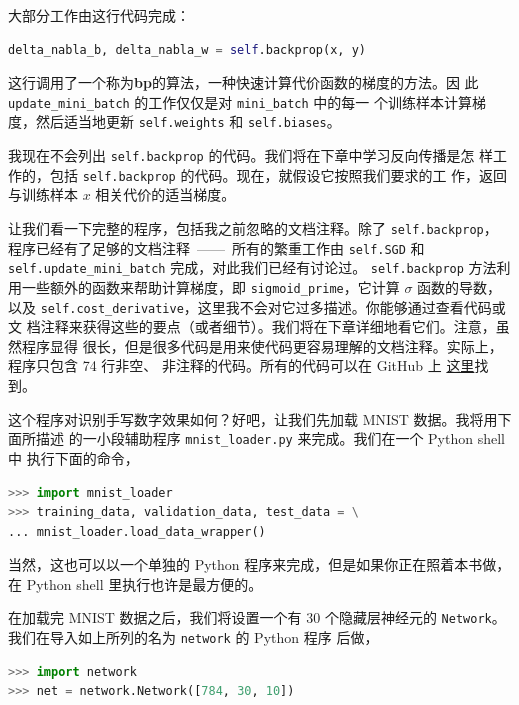 大部分工作由这行代码完成：
\begin{lstlisting}[language=Python]
     delta_nabla_b, delta_nabla_w = self.backprop(x, y)
\end{lstlisting}

这行调用了一个称为\textbf{\gls{bp}}的算法，一种快速计算代价函数的梯度的方法。因
此 \lstinline!update_mini_batch! 的工作仅仅是对 \lstinline!mini_batch! 中的每一
个训练样本计算梯度，然后适当地更新 \lstinline!self.weights! 和
\lstinline!self.biases!。

我现在不会列出 \lstinline!self.backprop! 的代码。我们将在下章中学习反向传播是怎
样工作的，包括 \lstinline!self.backprop! 的代码。现在，就假设它按照我们要求的工
作，返回与训练样本 $x$ 相关代价的适当梯度。

让我们看一下完整的程序，包括我之前忽略的文档注释。除了 \lstinline!self.backprop!，
程序已经有了足够的文档注释~——~所有的繁重工作由 \lstinline!self.SGD! 和
\lstinline!self.update_mini_batch! 完成，对此我们已经有讨论过。
\lstinline!self.backprop! 方法利用一些额外的函数来帮助计算梯度，即
\lstinline!sigmoid_prime!，它计算 $\sigma$ 函数的导数，以及
\lstinline!self.cost_derivative!，这里我不会对它过多描述。你能够通过查看代码或文
档注释来获得这些的要点（或者细节）。我们将在下章详细地看它们。注意，虽然程序显得
很长，但是很多代码是用来使代码更容易理解的文档注释。实际上，程序只包含 74 行非空、
非注释的代码。所有的代码可以在 GitHub 上%
\href{https://github.com/mnielsen/neural-networks-and-deep-learning/blob/master/src/network.py}{
  这里}找到。



这个程序对识别手写数字效果如何？好吧，让我们先加载 MNIST 数据。我将用下面所描述
的一小段辅助程序 \lstinline!mnist_loader.py! 来完成。我们在一个 Python shell 中
执行下面的命令，

\begin{lstlisting}[language=Python]
>>> import mnist_loader
>>> training_data, validation_data, test_data = \
... mnist_loader.load_data_wrapper()
\end{lstlisting}

当然，这也可以以一个单独的 Python 程序来完成，但是如果你正在照着本书做，在
Python shell 里执行也许是最方便的。

在加载完 MNIST 数据之后，我们将设置一个有 30 个隐藏层神经元的
\lstinline!Network!。我们在导入如上所列的名为 \lstinline!network! 的 Python 程序
后做，

\begin{lstlisting}[language=Python]
>>> import network
>>> net = network.Network([784, 30, 10])
\end{lstlisting}

